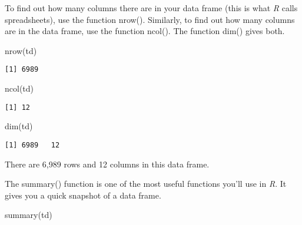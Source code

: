 \documentclass[
  10pt,
  letterpaper]{article}
\newenvironment{Shaded}{\begin{snugshade}}{\end{snugshade}}
\newcommand{\FunctionTok}[1]{\textcolor[rgb]{0.28,0.35,0.67}{#1}}
\newcommand{\NormalTok}[1]{\textcolor[rgb]{0.00,0.23,0.31}{#1}}
\renewcommand\texttt[1]{{\ttfamily\color{BrickRed}#1}}
\begin{document}
To find out how many columns there are in your data frame (this is what
\emph{R} calls spreadsheets), use the function \texttt{nrow()}.
Similarly, to find out how many columns are in the data frame, use the
function \texttt{ncol()}. The function \texttt{dim()} gives both.

\begin{Shaded}
\begin{Highlighting}[]
\FunctionTok{nrow}\NormalTok{(td)}
\end{Highlighting}
\end{Shaded}

\begin{verbatim}
[1] 6989
\end{verbatim}

\begin{Shaded}
\begin{Highlighting}[]
\FunctionTok{ncol}\NormalTok{(td)}
\end{Highlighting}
\end{Shaded}

\begin{verbatim}
[1] 12
\end{verbatim}

\begin{Shaded}
\begin{Highlighting}[]
\FunctionTok{dim}\NormalTok{(td)}
\end{Highlighting}
\end{Shaded}

\begin{verbatim}
[1] 6989   12
\end{verbatim}

There are 6,989 rows and 12 columns in this data frame.

The \texttt{summary()} function is one of the most useful functions
you'll use in \emph{R}. It gives you a quick snapshot of a data frame.

\begin{Shaded}
\begin{Highlighting}[]
\FunctionTok{summary}\NormalTok{(td)}
\end{Highlighting}
\end{Shaded}
\end{document}
